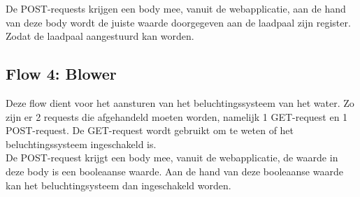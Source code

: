 De POST-requests krijgen een body mee, vanuit de webapplicatie, aan de hand van deze body wordt de juiste waarde doorgegeven aan de laadpaal zijn register. Zodat de laadpaal aangestuurd kan worden.

\subsection{Flow 4: Blower}
\label{subsec:proefopstelling-blower}
Deze flow dient voor het aansturen van het beluchtingssysteem van het water. Zo zijn er 2 requests die afgehandeld moeten worden, namelijk 1 GET-request en 1 POST-request. De GET-request wordt gebruikt om te weten of het beluchtingssysteem ingeschakeld is.\\

De POST-request krijgt een body mee, vanuit de webapplicatie, de waarde in deze body is een booleaanse waarde. Aan de hand van deze booleaanse waarde kan het beluchtingsysteem dan ingeschakeld worden.